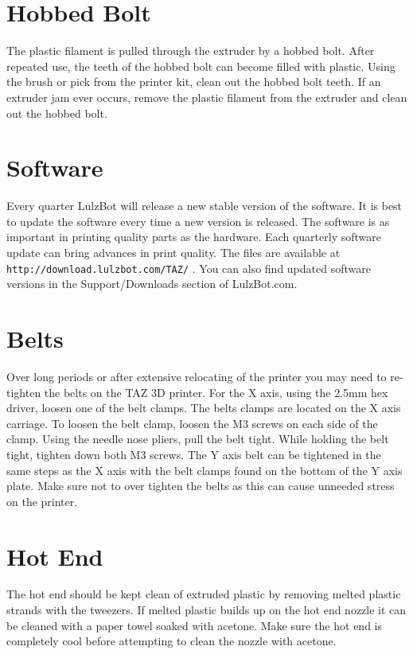 \section{Hobbed Bolt}
The plastic filament is pulled through the extruder by a hobbed bolt. After repeated use, the teeth of the hobbed bolt can become filled with plastic. Using the brush or pick from the printer kit, clean out the hobbed bolt teeth. If an extruder jam ever occurs, remove the plastic filament from the extruder and clean out the hobbed bolt.

\section{Software}
Every quarter LulzBot will release a new stable version of the software. It is best to update the software every time a new version is released. The software is as important in printing quality parts as the hardware. Each quarterly software update can bring advances in print quality. The files are available at \texttt{http://download.lulzbot.com/TAZ/} . You can also find updated software versions in the Support/Downloads section of LulzBot.com.

\section{Belts}
Over long periods or after extensive relocating of the printer you may need to re-tighten the belts on the TAZ 3D printer. For the X axis, using the 2.5mm hex driver, loosen one of the belt clamps. The belts clamps are located on the X axis carriage. To loosen the belt clamp, loosen the M3 screws on each side of the clamp. Using the needle nose pliers, pull the belt tight. While holding the belt tight, tighten down both M3 screws. The Y axis belt can be tightened in the same steps as the X axis with the belt clamps found on the bottom of the Y axis plate. Make sure not to over tighten the belts as this can cause unneeded stress on the printer.

\section{Hot End}
The hot end should be kept clean of extruded plastic by removing melted plastic strands with the tweezers. If melted plastic builds up on the hot end nozzle it can be cleaned with a paper towel soaked with acetone. Make sure the hot end is completely cool before attempting to clean the nozzle with acetone.


